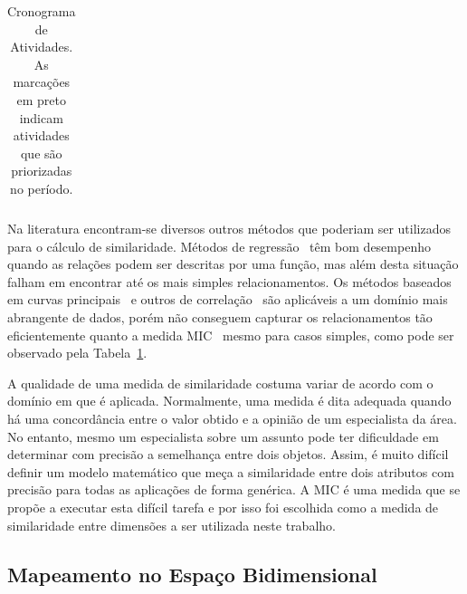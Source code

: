 \begin{table}
    \caption[Cronograma de atividades]{Cronograma de Atividades. As marcações em preto        indicam atividades que são priorizadas no período.}
    \begin{center}
        \begin{tabular}{|c|c|c|c|c|c|c|}
        \end{tabular}
    \end{center}
    \label{tab:corrs}
\end{table}




Na literatura encontram-se diversos outros métodos que poderiam ser utilizados para o cálculo de similaridade. Métodos de regressão~\cite{Friedman2001, Cleveland1988, Stone1977} têm bom desempenho quando as relações podem ser descritas por uma função, mas além desta situação falham em encontrar até os mais simples relacionamentos. Os métodos baseados em curvas principais~\cite{Hastie1989, Tibshirani1992, Delicado2008} e outros de correlação~\cite{Reny1959, Breiman1985, Kosorok2009} são aplicáveis a um domínio mais abrangente de dados, porém não conseguem capturar os relacionamentos tão eficientemente quanto a medida MIC~\cite{Reshef2011} mesmo para casos simples, como pode ser observado pela Tabela~\ref{tab:corrs}.    

A qualidade de uma medida de similaridade costuma variar de acordo com o domínio em que é aplicada. Normalmente, uma medida é dita adequada quando há uma concordância entre o valor obtido e a opinião de um especialista da área. No entanto, mesmo um especialista sobre um assunto pode ter dificuldade em determinar com precisão a semelhança entre dois objetos. Assim, é muito difícil definir um modelo matemático que meça a similaridade entre dois atributos com precisão para todas as aplicações de forma genérica. A MIC é uma medida que se propõe a executar esta difícil tarefa e por isso foi escolhida como a medida de similaridade entre dimensões a ser utilizada neste trabalho. 


\subsection{Mapeamento no Espaço Bidimensional}

